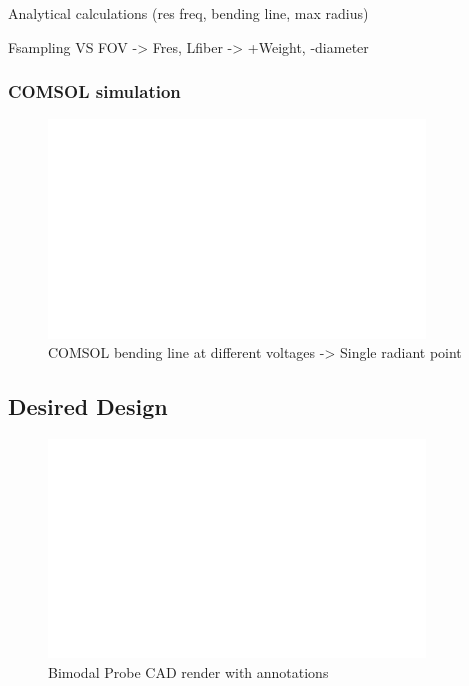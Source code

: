 Analytical calculations (res freq, bending line, max radius)

Fsampling VS FOV -> Fres, Lfiber -> +Weight, -diameter

\subsubsection{COMSOL simulation}
\begin{figure}[h!]\centering \includegraphics[width=10cm,draft]{figures/foo.png}
      \caption{COMSOL bending line at different voltages -> Single radiant point}
\end{figure}



\newpage
\subsection{Desired Design}
\begin{figure}[h!]\centering \includegraphics[width=10cm,draft]{figures/foo.png}
      \caption{Bimodal Probe CAD render with annotations}
\end{figure}


